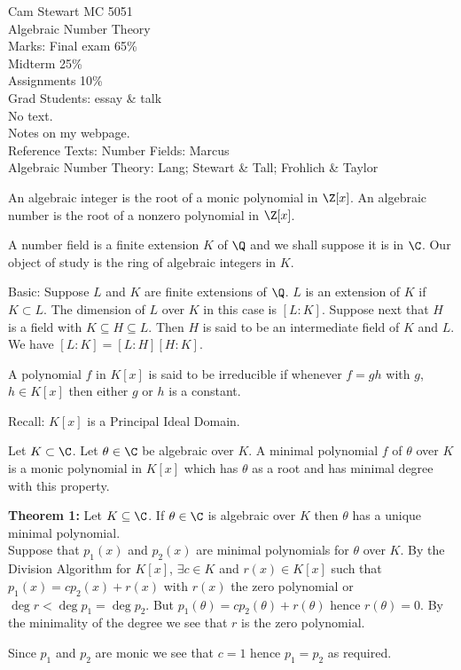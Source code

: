 Cam Stewart MC 5051 \\
Algebraic Number Theory \\
Marks: Final exam 65\% \\
\phantom{Marks: }Midterm 25\% \\
\phantom{Marks: }Assignments 10\% \\
Grad Students: essay \& talk \\
No text. \\
Notes on my webpage. \\
Reference Texts: Number Fields: Marcus \\
Algebraic Number Theory: Lang; Stewart \& Tall; Frohlich \& Taylor

 An algebraic integer is the root of a monic polynomial in $\Z[x]$.  An algebraic number is the root of a nonzero polynomial in $\Z[x]$.

A number field is a finite extension $K$ of $\Q$ and we shall suppose it is in $\C$.  Our object of study is the ring of algebraic integers in $K$.

Basic: Suppose $L$ and $K$ are finite extensions of $\Q$.  $L$ is an extension of $K$ if $K\subset L$.  The dimension of $L$ over $K$ in this case is $[L:K]$.  Suppose next that $H$ is a field with $K\subseteq H\subseteq L$.  Then $H$ is said to be an intermediate field of $K$ and $L$.  We have $[L:K]=[L:H][H:K]$.

A polynomial $f$ in $K[x]$ is said to be irreducible if whenever $f=gh$ with $g$, $h\in K[x]$ then either $g$ or $h$ is a constant.

Recall: $K[x]$ is a Principal Ideal Domain.

 Let $K\subset\C$.  Let $\theta\in\C$ be algebraic over $K$.  A minimal polynomial $f$ of $\theta$ over $K$ is a monic polynomial in $K[x]$ which has $\theta$ as a root and has minimal degree with this property.

\textbf{Theorem 1:} Let $K\subseteq\C$.  If $\theta\in\C$ is algebraic over $K$ then $\theta$ has a unique minimal polynomial. \\
\pf Suppose that $p_1(x)$ and $p_2(x)$ are minimal polynomials for $\theta$ over $K$.  By the Division Algorithm for $K[x]$, $\exists c\in K$ and $r(x)\in K[x]$ such that $p_1(x)=cp_2(x)+r(x)$ with $r(x)$ the zero polynomial or $\deg r<\deg p_1=\deg p_2$.  But $p_1(\theta)=cp_2(\theta)+r(\theta)$ hence $r(\theta)=0$.  By the minimality of the degree we see that $r$ is the zero polynomial.

Since $p_1$ and $p_2$ are monic we see that $c=1$ hence $p_1=p_2$ as required.

